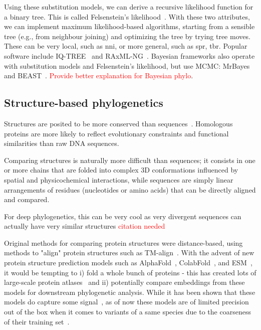Using these substitution models, we can derive a recursive likelihood function for a binary tree. This is called Felsenstein's likelihood~\cite{felsenstein1973}. With these two attributes, we can implement maximum likelihood-based algorithms, starting from a sensible tree (e.g., from neighbour joining) and optimizing the tree by trying tree moves. These can be very local, such as \gls{nni}, or more general, such as \gls{spr}, \gls{tbr}. Popular software include IQ-TREE~\cite{minh2020} and RAxML-NG~\cite{kozlov2019}. Bayesian frameworks also operate with substitution models and Felsenstein's likelihood, but use MCMC: MrBayes~\cite{huelsenbeck2001} and BEAST~\cite{bouckaert2014, baele2025}. \textcolor{red}{Provide better explanation for Bayesian phylo}.

\subsection{Structure-based phylogenetics}

Structures are posited to be more conserved than sequences~\cite{illergaard2009}. Homologous proteins are more likely to reflect evolutionary constraints and functional similarities than raw DNA sequences.

Comparing structures is naturally more difficult than sequences; it consists in one or more chains that are folded into complex 3D conformations influenced by spatial and physicochemical interactions, while sequences are simply linear arrangements of residues (nucleotides or amino acids) that can be directly aligned and compared.

For deep phylogenetics, this can be very cool as very divergent sequences can actually have very similar structures \textcolor{red}{citation needed}

Original methods for comparing protein structures were distance-based, using methods to "align" protein structures such as TM-align~\cite{zhang2005}. With the advent of new protein structure prediction models such as AlphaFold~\cite{jumper2021, gomez2024, abramson2024}, ColabFold~\cite{mirdita2022}, and ESM~\cite{lin2023, hayes2025}, it would be tempting to i) fold a whole bunch of proteins - this has created lots of large-scale protein atlases~\cite{varadi2022, lin2023, kim2025b} and ii) potentially compare embeddings from these models for downstream phylogenetic analysis. While it has been shown that these models do capture some signal~\cite{lupo2022, tule2025}, as of now these models are of limited precision out of the box when it comes to variants of a same species due to the coarseness of their training set~\cite{gomez2024}.

